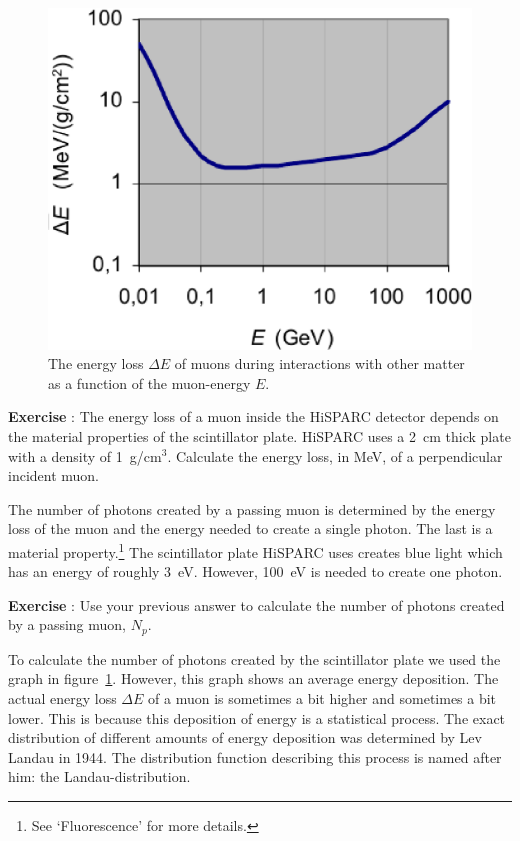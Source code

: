 \documentclass[12pt,a4paper]{article}
\numberwithin{equation}{section}
\numberwithin{figure}{section}
\newcounter{Exercise}
\numberwithin{table}{section}
\begin{document}
\begin{figure}\begin{center}
\includegraphics[scale=0.5]{energy_loss.eps}%
\caption{The energy loss $\Delta E$ of muons during interactions with other matter as a function of the muon-energy $E$.}\label{fig:energy_loss}
\end{center}\end{figure}

\begin{shaded}
\textbf{Exercise \theExercise {}} : The energy loss of a muon inside the HiSPARC detector depends on the material properties of the scintillator plate. HiSPARC uses a 2~cm thick plate with a density of 1~g/cm$^3$. Calculate the energy loss, in MeV, of a perpendicular incident muon.\end{shaded}

The number of photons created by a passing muon is determined by the energy loss of the muon and the energy needed to create a single photon. The last is a material property.\footnote{See `Fluorescence' for more details.} The scintillator plate HiSPARC uses creates blue light which has an energy of roughly 3~eV. However, 100~eV is needed to create one photon. 

\begin{shaded}
\textbf{Exercise \theExercise {}} :  Use your previous answer to calculate the number of photons created by a passing muon, $N_p$.\end{shaded}

To calculate the number of photons created by the scintillator plate we used the  graph in figure~\ref{fig:energy_loss}. However, this graph shows an average energy deposition. The actual energy loss $\Delta E$ of a muon is sometimes a bit higher and sometimes a bit lower. This is because this deposition of energy is a statistical process. The exact distribution of different amounts of energy deposition was determined by Lev Landau in 1944. The distribution function describing this process is named after him: the Landau-distribution.
\end{document}

